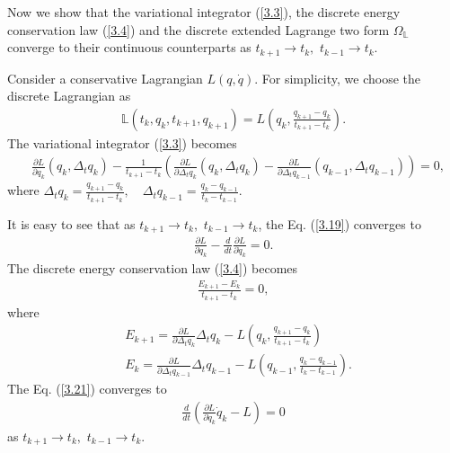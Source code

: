 \documentclass[a4paper,a4paper]{article}
\begin{document}
Now we show that the variational integrator (\ref{3.3}), the
discrete energy conservation law (\ref{3.4}) and the discrete
extended Lagrange two form $\Omega_{\mathbb{L}}$ converge to their
continuous counterparts as $t_{k+1}\to t_{k},\,\, t_{k-1}\to
t_{k}$.


Consider a conservative Lagrangian $L(q, \dot{q})$. For simplicity, we choose the
discrete Lagrangian as
\begin{align}
\mathbb{L}(t_{k}, q_{k}, t_{k+1}, q_{k+1})=L(q_{k}, \frac{q_{k+1}-q_{k}}
{t_{k+1}-t_{k}}).\label{3.18}
\end{align}
The variational integrator (\ref{3.3}) becomes
\begin{align}
   &\frac{\partial L}{\partial q_{k}}( q_{k}, \Delta_{t}q_{k})
   -\frac{1}{t_{k+1}-t_{k}}\left(\frac{\partial L}{\partial \Delta_{t}q_{k}}
    (q_{k}, \Delta_{t}q_{k})-\frac{\partial L}{\partial \Delta_{t}q_{k-1}}
    ( q_{k-1}, \Delta_{t}q_{k-1} )\right)=0, \label{3.19}
\end{align}
where $\Delta_{t}q_{k}=\frac{q_{k+1}-q_{k}}{t_{k+1}-t_{k}},\quad
\Delta_{t}q_{k-1}=\frac{q_{k}-q_{k-1}}{t_{k}-t_{k-1}}$.

It is easy to see that as $t_{k+1}\to
t_{k},\,\,  t_{k-1}\to t_{k}$,  the Eq. (\ref{3.19}) converges to
\begin{align}
\frac{\partial L}{\partial q_{k}}-\frac{d}{dt}
\frac{\partial L}{\partial \dot{q}_{k}}=0. \label{3.20}
\end{align}
\noindent
The discrete energy conservation law (\ref{3.4}) becomes
\begin{align}
\frac{E_{k+1}-E_{k}}{t_{k+1}-t_{k}}=0, \label{3.21}
\end{align}
where
\begin{align*}
  &E_{k+1}=\frac{\partial L}{\partial \Delta_{t}q_{k}}\Delta_{t}q_{k}
           -L(q_{k}, \frac{q_{k+1}-q_{k}}{t_{k+1}-t_{k}})\\
  &E_{k}=\frac{\partial L}{\partial \Delta_{t}q_{k-1}}\Delta_{t}q_{k-1}
           -L(q_{k-1}, \frac{q_{k}-q_{k-1}}{t_{k}-t_{k-1}}).
\end{align*}
The Eq. (\ref{3.21}) converges to
\begin{align}
\frac{d}{dt}\left(\frac{\partial L}{\partial \dot{q}_{k}}\dot{q}_{k}-L\right)=0
\label{3.22}
\end{align}
as $t_{k+1}\to t_{k},\,\, t_{k-1}\to t_{k}$.
\end{document}
